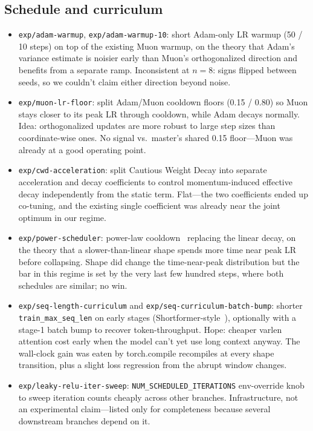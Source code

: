 \documentclass[10pt,letterpaper]{article}
\newcommand{\code}[1]{\texttt{\small #1}}
\begin{document}
\subsection{Schedule and curriculum}
\begin{itemize}[leftmargin=1.2em,itemsep=4pt]
  \item \code{exp/adam-warmup}, \code{exp/adam-warmup-10}: short Adam-only LR warmup (50 / 10 steps) on top of the existing Muon warmup, on the theory that Adam's variance estimate is noisier early than Muon's orthogonalized direction and benefits from a separate ramp. Inconsistent at $n=8$: signs flipped between seeds, so we couldn't claim either direction beyond noise.
  \item \code{exp/muon-lr-floor}: split Adam/Muon cooldown floors (0.15 / 0.80) so Muon stays closer to its peak LR through cooldown, while Adam decays normally. Idea: orthogonalized updates are more robust to large step sizes than coordinate-wise ones. No signal vs.\ master's shared 0.15 floor---Muon was already at a good operating point.
  \item \code{exp/cwd-acceleration}: split Cautious Weight Decay into separate acceleration and decay coefficients to control momentum-induced effective decay independently from the static term. Flat---the two coefficients ended up co-tuning, and the existing single coefficient was already near the joint optimum in our regime.
  \item \code{exp/power-scheduler}: power-law cooldown~\cite{power_scheduler} replacing the linear decay, on the theory that a slower-than-linear shape spends more time near peak LR before collapsing. Shape did change the time-near-peak distribution but the bar in this regime is set by the very last few hundred steps, where both schedules are similar; no win.
  \item \code{exp/seq-length-curriculum} and \code{exp/seq-curriculum-batch-bump}: shorter \code{train\_max\_seq\_len} on early stages (Shortformer-style~\cite{shortformer}), optionally with a stage-1 batch bump to recover token-throughput. Hope: cheaper varlen attention cost early when the model can't yet use long context anyway. The wall-clock gain was eaten by torch.compile recompiles at every shape transition, plus a slight loss regression from the abrupt window changes.
  \item \code{exp/leaky-relu-iter-sweep}: \code{NUM\_SCHEDULED\_ITERATIONS} env-override knob to sweep iteration counts cheaply across other branches. Infrastructure, not an experimental claim---listed only for completeness because several downstream branches depend on it.
\end{itemize}
\end{document}
